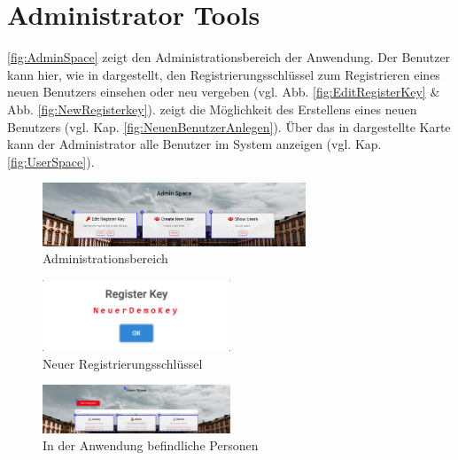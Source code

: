 \section{Administrator Tools}
\label{ssec:AdministratorTools}

\abb \vref{fig:AdminSpace} zeigt den Administrationsbereich der Anwendung. 
Der Benutzer kann hier, wie in \desOne dargestellt, den Registrierungsschlüssel zum Registrieren eines neuen Benutzers einsehen oder neu vergeben (vgl. Abb. \vref{fig:EditRegisterKey} \& Abb. \vref{fig:NewRegisterkey}). \newline
\desTwo zeigt die Möglichkeit des Erstellens eines neuen Benutzers (vgl. Kap. \vref{fig:NeuenBenutzerAnlegen}). 
Über das in \desThree dargestellte Karte kann der Administrator alle Benutzer im System anzeigen (vgl. Kap. \vref{fig:UserSpace}).

\begin{figure}[H]
	\centering
	\includegraphics[width=0.70\textwidth, keepaspectratio]{img/guide/AdminSpace.png}
	\captionsetup{justification=centering, format=plain}
	\caption[Administrationsbereich]{Administrationsbereich \\\quelleScreenshot}
	\label{fig:AdminSpace}
\end{figure}

\begin{figure}[H]
	\centering
	\includegraphics[width=0.5\textwidth, keepaspectratio]{img/guide/RegisterKey.png}
	\captionsetup{justification=centering, format=plain}
	\caption[Neuer Registrierungsschlüssel]{Neuer Registrierungsschlüssel \\\quelleScreenshot}
	\label{fig:NewRegisterkey}
\end{figure}

\begin{figure}[H]
	\centering
	\includegraphics[width=0.5\textwidth, keepaspectratio]{img/guide/UserSpace.png}
	\captionsetup{justification=centering, format=plain}
	\caption[In der Anwendung befindliche Personen]{In der Anwendung befindliche Personen \\\quelleScreenshot}
	\label{fig:UserSpace}
\end{figure}

